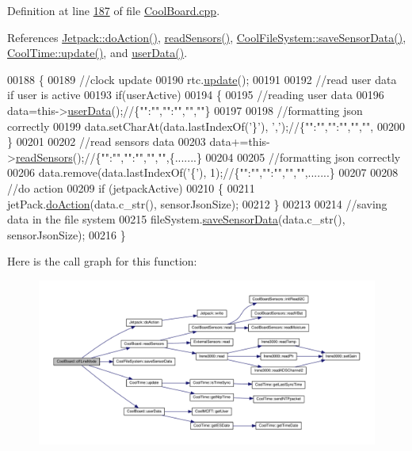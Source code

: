 Definition at line \hyperlink{_cool_board_8cpp_source_l00187}{187} of file \hyperlink{_cool_board_8cpp_source}{Cool\+Board.\+cpp}.



References \hyperlink{_jetpack_8cpp_source_l00114}{Jetpack\+::do\+Action()}, \hyperlink{_cool_board_8cpp_source_l00509}{read\+Sensors()}, \hyperlink{_cool_file_system_8cpp_source_l00038}{Cool\+File\+System\+::save\+Sensor\+Data()}, \hyperlink{_cool_time_8cpp_source_l00048}{Cool\+Time\+::update()}, and \hyperlink{_cool_board_8cpp_source_l00548}{user\+Data()}.


\begin{DoxyCode}
00188 \{
00189     \textcolor{comment}{//clock update}
00190     rtc.\hyperlink{class_cool_time_aae601f795452cfa48d9fb337aed483a8}{update}();
00191     
00192     \textcolor{comment}{//read user data if user is active}
00193     \textcolor{keywordflow}{if}(userActive)
00194     \{
00195         \textcolor{comment}{//reading user data}
00196         data=this->\hyperlink{class_cool_board_ae7358fb6e623cfc81b775f5f1734909b}{userData}();\textcolor{comment}{//\{"":"","":"","",""\}}
00197         
00198         \textcolor{comment}{//formatting json correctly}
00199         data.setCharAt(data.lastIndexOf(\textcolor{charliteral}{'\}'}), \textcolor{charliteral}{','});\textcolor{comment}{//\{"":"","":"","","",}
00200     \}   
00201     
00202     \textcolor{comment}{//read sensors data}
00203     data+=this->\hyperlink{class_cool_board_ad03abdce2e65f520bbf2cff0f2d083cf}{readSensors}();\textcolor{comment}{//\{"":"","":"","","",\{.......\}}
00204     
00205     \textcolor{comment}{//formatting json correctly}
00206     data.remove(data.lastIndexOf(\textcolor{charliteral}{'\{'}), 1);\textcolor{comment}{//\{"":"","":"","","",.......\}}
00207 
00208     \textcolor{comment}{//do action}
00209     \textcolor{keywordflow}{if} (jetpackActive)
00210     \{
00211         jetPack.\hyperlink{class_jetpack_a86d2e83436ef4b85f4c3a6e85ac785b0}{doAction}(data.c\_str(), sensorJsonSize);
00212     \}
00213     
00214     \textcolor{comment}{//saving data in the file system}
00215     fileSystem.\hyperlink{class_cool_file_system_a4c560c2ddd40b74b7758e6ceb2c58957}{saveSensorData}(data.c\_str(), sensorJsonSize);
00216 \}
\end{DoxyCode}
Here is the call graph for this function\+:
\nopagebreak
\begin{figure}[H]
\begin{center}
\leavevmode
\includegraphics[width=350pt]{class_cool_board_ae6b5e1274d760462290192acea4adca8_cgraph}
\end{center}
\end{figure}
